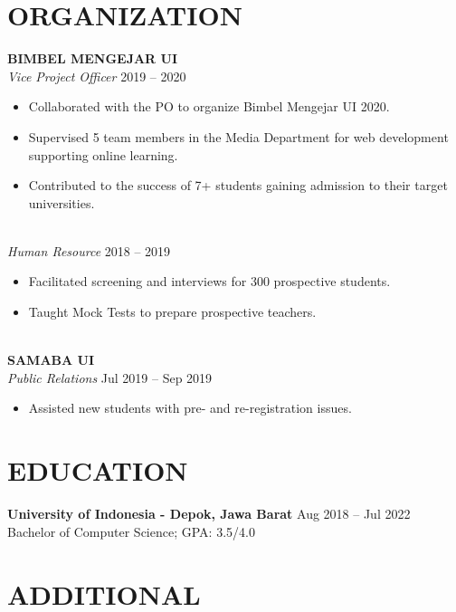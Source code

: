 \documentclass[a4paper,10pt]{article}
\begin{document}
\section*{ORGANIZATION}

\textbf{BIMBEL MENGEJAR UI} \\
\textit{Vice Project Officer} \hfill 2019 -- 2020
\begin{itemize}
    \item Collaborated with the PO to organize Bimbel Mengejar UI 2020.
    \item Supervised 5 team members in the Media Department for web development supporting online learning.
    \item Contributed to the success of 7+ students gaining admission to their target universities.
\end{itemize}\\
\textit{Human Resource} \hfill 2018 -- 2019
\begin{itemize}
    \item Facilitated screening and interviews for 300 prospective students.
    \item Taught Mock Tests to prepare prospective teachers.
\end{itemize}\\
\textbf{SAMABA UI} \\
\textit{Public Relations} \hfill Jul 2019 -- Sep 2019
\begin{itemize}
    \item Assisted new students with pre- and re-registration issues.
\end{itemize}

\section*{EDUCATION}

\textbf{University of Indonesia - Depok, Jawa Barat} \hfill Aug 2018 -- Jul 2022 \\
Bachelor of Computer Science; GPA: 3.5/4.0



\section*{ADDITIONAL}
\end{document}
